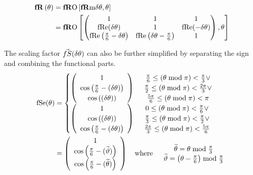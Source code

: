 \begin{align}\label{eq:factoredMatrixDef}
\fR[\theta] & = \fRO \left[ \fRm{\thetaA} , \theta \right] \\
& = \fRO \left[
\begin{pmatrix}
 1 & 1 & 1 \\
 \text{fRe} (\thetaA)  & 1 & \text{fRe} (-\thetaA ) \\
 \text{fRe} \left(\frac{\pi }{6}-\thetaA \right) & \text{fRe} \left(\thetaA -\frac{\pi }{6}\right) & 1 \\
\end{pmatrix} , \theta \right]
\end{align}

The scaling factor $\fS ( \thetaA )$ can also be further simplified by separating the sign and combining the functional parts.
\begin{align}
\fSe(\theta) 
&=
\begin{cases}
 \left(
\begin{array}{c}
 1 \\
 \cos \left(\frac{\pi }{6}-(\thetaA)\right) \\
 \cos \left((\thetaA)\right) \\
\end{array}
\right) & 
\begin{array}{c}
\frac{\pi }{6}\leq (\theta  \bmod \pi )<\frac{\pi }{3}\lor \\
\frac{\pi }{2}\leq (\theta  \bmod \pi )<\frac{2 \pi }{3}\lor \\
\frac{5 \pi}{6}\leq (\theta  \bmod \pi )<\pi  \\
\end{array} \\
 \left(
\begin{array}{c}
 1 \\
 \cos \left((\thetaA)\right) \\
 \cos \left(\frac{\pi }{6}-(\thetaA)\right) \\
\end{array}
\right)  & 
\begin{array}{c}
0\leq (\theta  \bmod \pi )<\frac{\pi }{6}\lor \\
\frac{\pi }{3}\leq (\theta  \bmod \pi ) < \frac{\pi }{2}\lor \\
\frac{2 \pi }{3}\leq (\theta \bmod \pi ) <\frac{5 \pi }{6} \\
\end{array}
\end{cases} \\
&= 
\left(
\begin{array}{c}
 1 \\
 \cos \left(\frac{\pi }{6}-(\widetilde{\vartheta})\right) \\
 \cos \left(\frac{\pi }{6}-(\widetilde{\theta} )\right) \\
\end{array}
\right) 
\quad \text{where}  \quad 
\begin{array}{c}
\widetilde{\theta} = \theta  \bmod \frac{\pi }{3} \\ 
\widetilde{\vartheta} = \left(\theta - \Pii{6}\right) \bmod \frac{\pi }{3}
\end{array}
\end{align}

